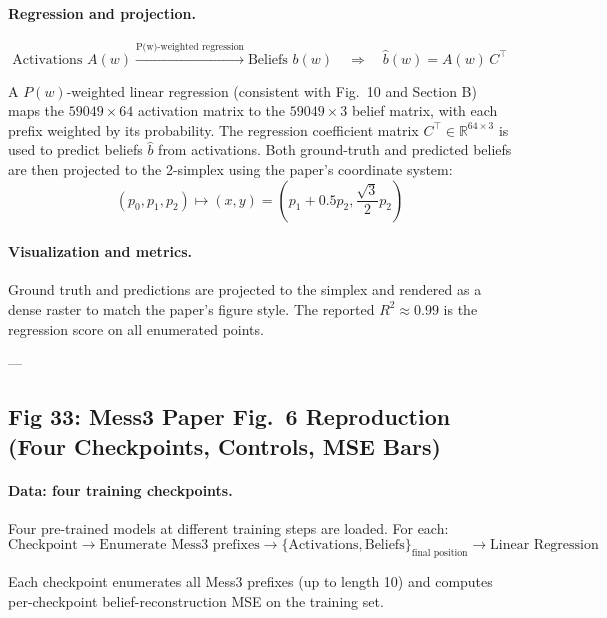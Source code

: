 \documentclass[11pt]{article}
\begin{document}
\paragraph{Regression and projection.}
\begin{equation}
\text{Activations } A(w) \xrightarrow{\text{P(w)-weighted regression}} \text{Beliefs } b(w)
\quad \Rightarrow \quad \hat{b}(w) = A(w) \, C^{\top}
\end{equation}

A $P(w)$-weighted linear regression (consistent with Fig.\ 10 and Section B) maps the $59049 \times 64$ activation matrix to the $59049 \times 3$ belief matrix, with each prefix weighted by its probability. The regression coefficient matrix $C^{\top} \in \mathbb{R}^{64 \times 3}$ is used to predict beliefs $\hat{b}$ from activations. Both ground-truth and predicted beliefs are then projected to the 2-simplex using the paper's coordinate system:
\begin{equation}
(p_0, p_1, p_2) \mapsto (x, y) = \left(p_1 + 0.5 p_2, \frac{\sqrt{3}}{2} p_2\right)
\end{equation}

\paragraph{Visualization and metrics.}
Ground truth and predictions are projected to the simplex and rendered as a dense raster to match the paper's figure style. The reported $R^2 \approx 0.99$ is the regression score on all enumerated points.

---

\subsection{Fig 33: Mess3 Paper Fig.\ 6 Reproduction (Four Checkpoints, Controls, MSE Bars)}

\paragraph{Data: four training checkpoints.}
Four pre-trained models at different training steps are loaded. For each:
\begin{equation}
\text{Checkpoint} \to \text{Enumerate Mess3 prefixes} \to
\{\text{Activations}, \text{Beliefs}\}_{\text{final position}} \to
\text{Linear Regression}
\end{equation}

Each checkpoint enumerates all Mess3 prefixes (up to length 10) and computes per-checkpoint belief-reconstruction MSE on the training set.
\end{document}
